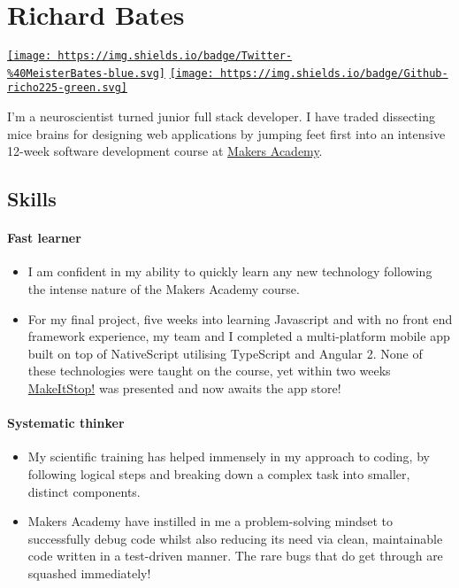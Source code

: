 \documentclass[]{article}
\date{}
\providecommand{\tightlist}{%
  \setlength{\itemsep}{0pt}\setlength{\parskip}{0pt}}
\let\oldparagraph\paragraph
\renewcommand{\paragraph}[1]{\oldparagraph{#1}\mbox{}}
\begin{document}
\section{Richard Bates}\label{richard-bates}

\href{https://twitter.com/Meister_Bates}{\texttt{[image: https://img.shields.io/badge/Twitter-\\\%40MeisterBates-blue.svg]}}
\href{https://github.com/richo225}{\texttt{[image: https://img.shields.io/badge/Github-richo225-green.svg]}}

I'm a neuroscientist turned junior full stack developer. I have traded
dissecting mice brains for designing web applications by jumping feet
first into an intensive 12-week software development course at
\href{https://github.com/makersacademy}{Makers Academy}.

\subsection{Skills}\label{skills}

\paragraph{Fast learner}\label{fast-learner}

\begin{itemize}
\tightlist
\item
  I am confident in my ability to quickly learn any new technology
  following the intense nature of the Makers Academy course.
\item
  For my final project, five weeks into learning Javascript and with no
  front end framework experience, my team and I completed a
  multi-platform mobile app built on top of NativeScript utilising
  TypeScript and Angular 2. None of these technologies were taught on
  the course, yet within two weeks
  \href{https://github.com/MakeItStop/task-based-alarm}{MakeItStop!} was
  presented and now awaits the app store!
\end{itemize}

\paragraph{Systematic thinker}\label{systematic-thinker}

\begin{itemize}
\tightlist
\item
  My scientific training has helped immensely in my approach to coding,
  by following logical steps and breaking down a complex task into
  smaller, distinct components.
\item
  Makers Academy have instilled in me a problem-solving mindset to
  successfully debug code whilst also reducing its need via clean,
  maintainable code written in a test-driven manner. The rare bugs that
  do get through are squashed immediately!
\end{itemize}
\end{document}
